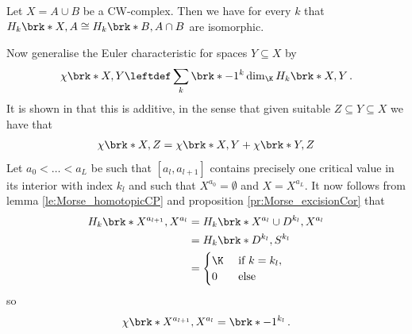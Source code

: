 \begin{proposition}
  \label{pr:Morse_excisionCor}
  Let $X=A\cup B$ be a CW-complex. Then we have for every $k$ that $H_k\brk*{X,A}\cong H_k\brk*{B,A\cap B}$
  are isomorphic.
\end{proposition}
Now generalise the Euler characteristic for spaces $Y\subseteq X$ by
\begin{align}
  \chi\brk*{X,Y}\leftdef \sum_k\brk*{-1}^k\dim_\K H_k\brk*{X,Y}\,.
  \label{eq:Morse_relativeEuler}
\end{align}
It is shown in \cite[§5]{Milnor1963} that this is additive, in the sense that given suitable $Z\subseteq Y\subseteq X$
we have that
\begin{align}
  \chi\brk*{X,Z}=\chi\brk*{X,Y}+\chi\brk*{Y,Z}\label{eq:MorseIneq_additivChi}
\end{align}
Let $a_0<\dots<a_L$ be such that $[a_l,a_{l+1}]$ contains precisely one critical value in its interior with
index $k_l$ and such that $X^{a_0}=\emptyset$ and  $X=X^{a_L}$.
It now follows from lemma \ref{le:Morse_homotopicCP} and proposition \ref{pr:Morse_excisionCor} that
\begin{align*}
  H_k\brk*{X^{a_{l+1}},X^{a_{l}}}
  &=H_k\brk*{X^{a_{l}}\cup D^{k_l},X^{a_{l}}} \\
  &= H_k\brk*{D^{k_l},S^{k_l}} \\
  &=\begin{cases}
    \K &\text{ if }k=k_l,\\
    0 &\text{ else}
  \end{cases}
\end{align*}
so
\begin{align}
  \chi\brk*{X^{a_{l+1}},X^{a_l}}=\brk*{-1}^{k_l}\,.\label{eq:Morse_chiSingleCP}
\end{align}
